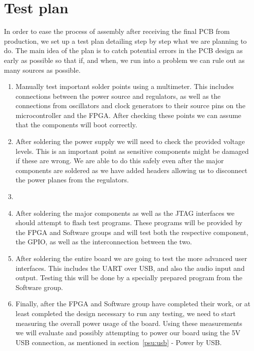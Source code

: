 \section{Test plan}

In order to ease the process of assembly after receiving the final PCB from 
production, we set up a test plan detailing step by step what we are planning
to do. The main idea of the plan is to catch potential errors in the PCB design
as early as possible so that if, and when, we run into a problem we can rule
out as many sources as possible.

\begin{enumerate}
    \item Manually test important solder points using a multimeter. This includes connections between the power source and regulators, as well as the connections from oscillators and clock generators to their source pins on the microcontroller and the FPGA. After checking these points we can assume that the components will boot correctly.
    \item After soldering the power supply we will need to check the provided voltage levels. This is an important point as sensitive components might be damaged if these are wrong. We are able to do this safely even after the major components are soldered as we have added headers allowing us to disconnect the power planes from the regulators. 
    \item  {}
    \item After soldering the major components as well as the JTAG interfaces we should attempt to flash test programs. These programs will be provided by the FPGA and Software groups and will test both the respective component, the GPIO, as well as the interconnection between the two.
    \item After soldering the entire board we are going to test the more advanced user interfaces. This includes the UART over USB, and also the audio input and output. Testing this will be done by a specially prepared program from the Software group.
    \item Finally, after the FPGA and Software group have completed their work, or at least completed the design necessary to run any testing, we need to start measuring the overall power usage of the board. Using these measurements we will evaluate and possibly attempting to power our board using the 5V USB connection, as mentioned in section~\ref{psu:usb} - Power by USB.
\end{enumerate}
